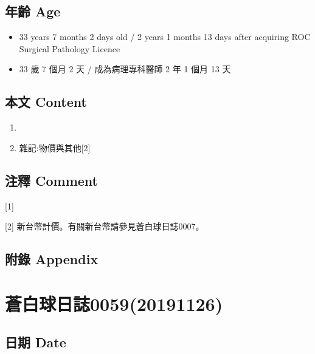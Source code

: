 \documentclass[a5paper, 12pt
]{book}
\providecommand{\tightlist}{%
  \setlength{\itemsep}{0pt}\setlength{\parskip}{0pt}}
\begin{document}
\hypertarget{ux5e74ux9f61-age-57}{%
\subsection{年齡 Age}\label{ux5e74ux9f61-age-57}}

\begin{itemize}
\tightlist
\item
  33 years 7 months 2 days old / 2 years 1 months 13 days after
  acquiring ROC Surgical Pathology Licence
\item
  33 歲 7 個月 2 天 / 成為病理專科醫師 2 年 1 個月 13 天
\end{itemize}

\hypertarget{ux672cux6587-content-57}{%
\subsection{本文 Content}\label{ux672cux6587-content-57}}

\begin{enumerate}
\def\labelenumi{\arabic{enumi}.}
\item
\item
  雜記:物價與其他{[}2{]}
\end{enumerate}

\hypertarget{ux6ce8ux91cb-comment-51}{%
\subsection{注釋 Comment}\label{ux6ce8ux91cb-comment-51}}

{[}1{]}

{[}2{]} 新台幣計價。有關新台幣請參見蒼白球日誌0007。

\hypertarget{ux9644ux9304-appendix-50}{%
\subsection{附錄 Appendix}\label{ux9644ux9304-appendix-50}}

\hypertarget{ux84bcux767dux7403ux65e5ux8a8c005920191126}{%
\section{蒼白球日誌0059(20191126)}\label{ux84bcux767dux7403ux65e5ux8a8c005920191126}}

\hypertarget{ux65e5ux671f-date-58}{%
\subsection{日期 Date}\label{ux65e5ux671f-date-58}}
\end{document}
